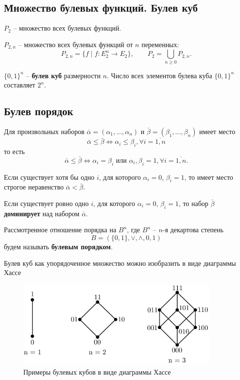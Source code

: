 \subsection{Множество булевых функций. Булев куб}

\(P_2\) -- множество всех булевых функций.

\(P_{2, n}\) -- множество всех булевых функций от \(n\) переменных:
\[
    P_{2, n} = \{f \mid f : E_2^n \to E_2\},
    \qquad
    P_2 = \bigcup_{n \geq 0} P_{2, n}.
\]

\(\{0, 1\}^n\) -- \textbf{булев куб} размерности \(n\). Число всех элементов булева куба \(\{0, 1\}^n\) составляет \(2^n\).

\subsection{Булев порядок}

Для произвольных наборов \(\bar{\alpha} = (\alpha_1, \ldots, \alpha_n)\) и \(\bar{\beta} = (\beta_1, \ldots, \beta_n)\) имеет место
\[
    \bar{\alpha} \leq \bar{\beta}
    \iff
    \alpha_i \leq \beta_i,
    \forall i = \overline{1, n}
\]
то есть
\[
    \bar{\alpha} \leq \bar{\beta}
    \iff
    \alpha_i = \beta_i
    \text{ или }
    \alpha_i, \beta_i = 1, \forall i = \overline{1, n}.
\]

Если существует хотя бы одно \(i\), для которого \(\alpha_i = 0\), \(\beta_i = 1\), то имеет место строгое неравенство \(\bar{\alpha} < \bar{\beta}\).

Если существует ровно одно \(i\), для которого \(\alpha_i = 0\), \(\beta_i = 1\), то набор \(\bar{\beta}\) \textbf{доминирует} над набором \(\bar{\alpha}\).

Рассмотренное отношение порядка на \(B^n\), где \(B^n\) -- \(n\)-я декартова степень
\[
    B = (\{0, 1\}, \lor, \land, 0, 1)
\]
будем называть \textbf{булевым порядком}.

Булев куб как упорядоченное множество можно изобразить в виде диаграммы Хассе
\begin{figure}[H]
    \centering
    \includegraphics[width=0.9\textwidth]{images/boolean-cube.png}
    \caption{Примеры булевых кубов в виде диаграммы Хассе}
\end{figure}

